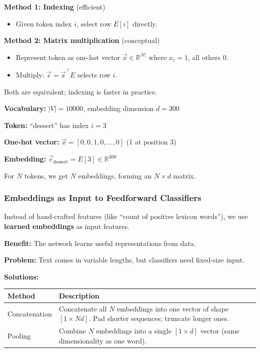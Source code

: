\begin{defbox}
\textbf{Method 1: Indexing} (efficient)
\begin{itemize}
  \item Given token index $i$, select row $E[i]$ directly.
\end{itemize}

\textbf{Method 2: Matrix multiplication} (conceptual)
\begin{itemize}
  \item Represent token as one-hot vector $\vec{x} \in \mathbb{R}^{|V|}$ where $x_i = 1$, all others $0$.
  \item Multiply: $\vec{e} = \vec{x}^\top E$ selects row $i$.
\end{itemize}

Both are equivalent; indexing is faster in practice.
\end{defbox}

\begin{exbox}
\textbf{Vocabulary:} $|V| = 10000$, embedding dimension $d = 300$

\textbf{Token:} ``dessert'' has index $i = 3$

\textbf{One-hot vector:} $\vec{x} = [0, 0, 1, 0, \ldots, 0]$ (1 at position 3)

\textbf{Embedding:} $\vec{e}_{\text{dessert}} = E[3] \in \mathbb{R}^{300}$

For $N$ tokens, we get $N$ embeddings, forming an $N \times d$ matrix.
\end{exbox}

\bigseparator

\subsubsection{Embeddings as Input to Feedforward Classifiers}

\begin{keybox}
Instead of hand-crafted features (like ``count of positive lexicon words''), we use \textbf{learned embeddings} as input features.

\textbf{Benefit:} The network learns useful representations from data.
\end{keybox}

\textbf{Problem:} Text comes in variable lengths, but classifiers need fixed-size input.

\textbf{Solutions:}
\begin{center}
\renewcommand{\arraystretch}{1.3}
\begin{tabular}{@{} l p{9cm} @{}}
\toprule
\textbf{Method} & \textbf{Description} \\
\midrule
Concatenation & Concatenate all $N$ embeddings into one vector of shape $[1 \times Nd]$. Pad shorter sequences; truncate longer ones. \\
Pooling & Combine $N$ embeddings into a single $[1 \times d]$ vector (same dimensionality as one word). \\
\bottomrule
\end{tabular}
\end{center}

